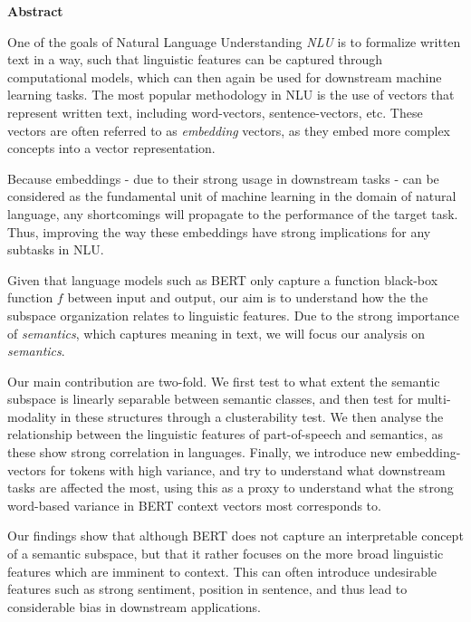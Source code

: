 \newpage
{\Huge \bf Abstract}
\vspace{24pt} 

One of the goals of Natural Language Understanding \textit{NLU} is to formalize written text in a way, such that linguistic features can be captured through computational models, which can then again be used for downstream machine learning tasks.
The most popular methodology in NLU is the use of vectors that represent written text, including word-vectors, sentence-vectors, etc. 
These vectors are often referred to as \textit{embedding} vectors, as they embed more complex concepts into a vector representation.

Because embeddings - due to their strong usage in downstream tasks - can be considered as the fundamental unit of machine learning in the domain of natural language, any shortcomings will propagate to the performance of the target task.
Thus, improving the way these embeddings have strong implications for any subtasks in NLU.

Given that language models such as BERT only capture a function black-box function $f$ between input and output, our aim is to understand how the the subspace organization relates to linguistic features.
Due to the strong importance of \textit{semantics}, which captures meaning in text, we will focus our analysis on \textit{semantics}.

Our main contribution are two-fold. 
We first test to what extent the semantic subspace is linearly separable between semantic classes, and then test for multi-modality in these structures through a clusterability test.
We then analyse the relationship between the linguistic features of part-of-speech and semantics, as these show strong correlation in languages.
Finally, we introduce new embedding-vectors for tokens with high variance, and try to understand what downstream tasks are affected the most, using this as a proxy to understand what the strong word-based variance in BERT context vectors most corresponds to.

Our findings show that although BERT does not capture an interpretable concept of a semantic subspace, but that it rather focuses on the more broad linguistic features which are imminent to context.
This can often introduce undesirable features such as strong sentiment, position in sentence, and thus lead to considerable bias in downstream applications.

